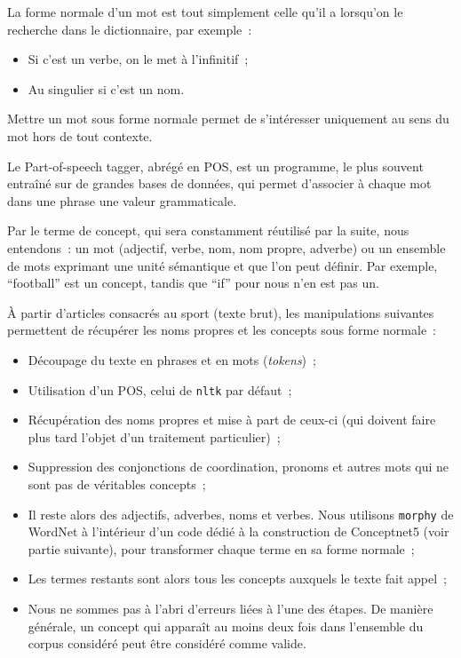 \documentclass[a4paper, 12pt]{article}
\newcommand{\pyt}[1]{\texttt{#1}}%
\begin{document}
\begin{definition}
La forme normale d'un mot est tout simplement celle qu'il a lorsqu'on le recherche dans le dictionnaire, par exemple~:
\begin{itemize}
 \item Si c'est un verbe, on le met à l'infinitif~;
 \item Au singulier si c'est un nom.
\end{itemize}
Mettre un mot sous forme normale permet de s'intéresser uniquement au sens du mot hors de tout contexte.
\end{definition}


\begin{definition}
Le Part-of-speech tagger, abrégé en POS, est un programme, le plus souvent entraîné sur de grandes bases de données, qui permet d'associer à chaque mot dans une phrase une valeur grammaticale.
\end{definition}

\begin{definition}[Concept]
Par le terme de concept, qui sera constamment réutilisé par la suite, nous entendons~: un mot (adjectif, verbe, nom, nom propre, adverbe) ou un ensemble de mots exprimant une unité sémantique et que l'on peut définir. Par exemple, ``football'' est un concept, tandis que ``if'' pour nous n'en est pas un.
\end{definition}

\`A partir d'articles consacrés au sport (texte brut), les manipulations suivantes permettent de récupérer les noms propres et les concepts sous forme normale~:
\begin{itemize}
 \item Découpage du texte en phrases et en mots (\textit{tokens})~;
 \item Utilisation d'un POS, celui de \pyt{nltk} par défaut~;
 \item Récupération des noms propres et mise à part de ceux-ci (qui doivent faire plus tard l'objet d'un traitement particulier)~;
 \item Suppression des conjonctions de coordination, pronoms et autres mots qui ne sont pas de véritables concepts~;
 \item Il reste alors des adjectifs, adverbes, noms et verbes. Nous utilisons \pyt{morphy} de WordNet à l'intérieur d'un code dédié à la construction de Conceptnet5 (voir partie suivante), pour transformer chaque terme en sa forme normale~;
 \item Les termes restants sont alors tous les concepts auxquels le texte fait appel~;
 \item Nous ne sommes pas à l'abri d'erreurs liées à l'une des étapes. De manière générale, un concept qui apparaît au moins deux fois dans l'ensemble du corpus considéré peut être considéré comme valide.
\end{itemize}
\end{document}

